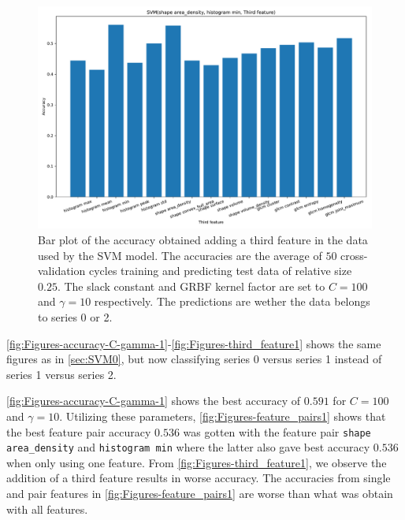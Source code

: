 \begin{figure}[H]
\centering
\includegraphics[width=1\textwidth]{Figures/third_feature1}
\caption{Bar plot of the accuracy obtained adding a third feature in the data used 
by the SVM model. The accuracies are the average 
of $50$ cross-validation cycles training and predicting test data of relative size $0.25$.
The slack constant and GRBF kernel factor are set to $C=100$ and $\gamma=10 $ respectively. 
 The predictions are wether the data belongs to series 0 or 2.}
\label{fig:Figures-third_feature1}
\end{figure}

\autoref{fig:Figures-accuracy-C-gamma-1}-\autoref{fig:Figures-third_feature1} shows the same figures as in \autoref{sec:SVM0}, but now 
classifying series 0 versus series 1 instead of series 1 versus series 2.

\autoref{fig:Figures-accuracy-C-gamma-1} shows the best accuracy of $0.591$  for $C=100$ and $\gamma =10$.
Utilizing these parameters, \autoref{fig:Figures-feature_pairs1} shows that the best feature pair accuracy $0.536$ was gotten with the feature pair 
\verb|shape area_density| and \verb|histogram min| where the latter also gave best accuracy $0.536$ when only using one feature.
From \autoref{fig:Figures-third_feature1}, we observe the addition of a third feature results in worse accuracy. 
The accuracies from single and pair features in \autoref{fig:Figures-feature_pairs1} are worse than what was obtain 
with all features. 

